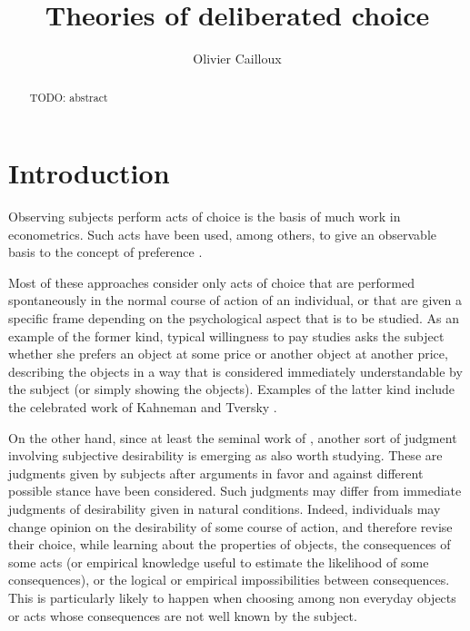 \documentclass[version=last, pagesize, twoside=off, bibliography=totoc, DIV=calc, fontsize=12pt, a4paper, french, english]{scrartcl}
\begin{document}
\title{Theories of deliberated choice}
\author{Olivier Cailloux}
\makeatletter
{}
\makeatother
\maketitle

\begin{abstract}
  TODO: abstract
\end{abstract}

\section{Introduction}
Observing subjects perform acts of choice is the basis of much work in econometrics. Such acts have been used, among others, to give an observable basis to the concept of preference \citep{samuelson_foundations_1983}. %

Most of these approaches consider only acts of choice that are performed spontaneously in the normal course of action of an individual, or that are given a specific frame depending on the psychological aspect that is to be studied. As an example of the former kind, typical willingness to pay studies asks the subject whether she prefers an object at some price or another object at another price, describing the objects in a way that is considered immediately understandable by the subject (or simply showing the objects). Examples of the latter kind include the celebrated work of Kahneman and Tversky \citep{bell_descriptive_1988, kahneman_thinking_2012}.

On the other hand, since at least the seminal work of \citet{fishkin_when_2011}, another sort of judgment involving subjective desirability is emerging as also worth studying. These are judgments given by subjects after arguments in favor and against different possible stance have been considered. Such judgments may differ from immediate judgments of desirability given in natural conditions. Indeed, individuals may change opinion on the desirability of some course of action, and therefore revise their choice, while learning about the properties of objects, the consequences of some acts (or empirical knowledge useful to estimate the likelihood of some consequences), or the logical or empirical impossibilities between consequences. This is particularly likely to happen when choosing among non everyday objects or acts whose consequences are not well known by the subject.
\end{document}
